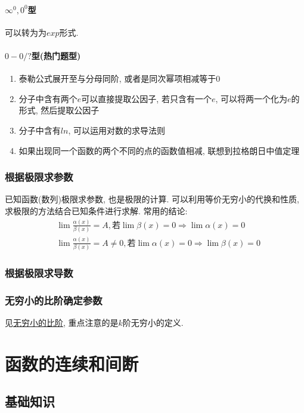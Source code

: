 \subsubsection{$ \infty^{0}, 0^{0} $型}
可以转为为$ exp $形式.
\subsubsection{$ 0-0/? $型(热门题型)}
\begin{enumerate}
    \item 泰勒公式展开至与分母同阶, 或者是同次幂项相减等于$ 0 $
    \item 分子中含有两个$ e $可以直接提取公因子, 若只含有一个$ e $, 可以将两一个化为$ e $的形式, 然后提取公因子
    \item 分子中含有$ ln $, 可以运用对数的求导法则
    \item 如果出现同一个函数的两个不同的点的函数值相减, 联想到拉格朗日中值定理
\end{enumerate}
\subsection{根据极限求参数}
已知函数(数列)极限求参数, 也是极限的计算. 可以利用等价无穷小的代换和性质, 求极限的方法结合已知条件进行求解. 常用的结论:
\begin{equation*}
    \begin{aligned}
         & \lim\limits \frac{\alpha(x)}{\beta(x)}=A, 若 \lim\limits \beta(x)=0\Rightarrow \lim\limits \alpha(x)=0       \\
         & \lim\limits \frac{\alpha(x)}{\beta(x)}=A\neq 0, 若 \lim\limits \alpha(x)=0\Rightarrow \lim\limits \beta(x)=0
    \end{aligned}
\end{equation*}
\subsection{根据极限求导数}
\subsection{无穷小的比阶确定参数}
见\hyperref[无穷小的比阶]{无穷小的比阶}, 重点注意的是$ k $阶无穷小的定义.
\chapter{函数的连续和间断}
\section{基础知识}
